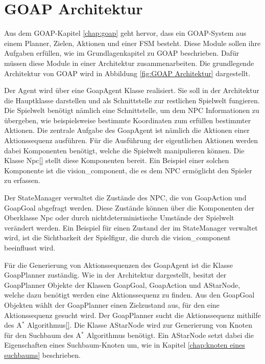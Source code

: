 \section{GOAP Architektur}
\label{chap:goap architektur}

Aus dem GOAP-Kapitel \ref{chap:goap} geht hervor, dass ein GOAP-System aus einem Planner, Zielen, Aktionen und einer FSM besteht. Diese Module sollen ihre Aufgaben erfüllen, wie im Grundlagenkapitel zu GOAP beschrieben. Dafür müssen diese Module in einer Architektur zusammenarbeiten. Die grundlegende Architektur von GOAP wird in Abbildung \ref{fig:GOAP Architektur} dargestellt.

Der Agent wird über eine GoapAgent Klasse realisiert. Sie soll in der Architektur die Hauptklasse darstellen und als Schnittstelle zur restlichen Spielwelt fungieren. Die Spielwelt benötigt nämlich eine Schnittstelle, um dem NPC Informationen zu übergeben, wie beispielsweise bestimmte Koordinaten zum erfüllen bestimmter Aktionen. Die zentrale Aufgabe des GoapAgent ist nämlich die Aktionen einer Aktionssequenz ausführen. Für die Ausführung der eigentlichen Aktionen werden dabei Komponenten benötigt, welche die Spielwelt manipulieren können. Die Klasse Npc\ref{} stellt diese Komponenten bereit. Ein Beispiel einer solchen Komponente ist die vision\_component, die es dem NPC ermöglicht den Spieler zu erfassen.

Der StateManager verwaltet die Zustände des NPC, die von GoapAction und GoapGoal abgefragt werden. Diese Zustände können über die Komponenten der Oberklasse Npc oder durch nichtdeterministische Umstände der Spielwelt verändert werden. Ein Beispiel für einen Zustand der im StateManager verwaltet wird, ist die Sichtbarkeit der Spielfigur, die durch die vision\_component beeinflusst wird.

Für die Generierung von Aktionssequenzen des GoapAgent ist die Klasse GoapPlanner zuständig. Wie in der Architektur dargestellt, besitzt der GoapPlanner Objekte der Klassen GoapGoal, GoapAction und AStarNode, welche dazu benötigt werden eine Aktionssequenz zu finden. Aus den GoapGoal Objekten wählt der GoapPlanner einen Zielzustand aus, für den eine Aktionssequenz gesucht wird. Der GoapPlanner sucht die Aktionssequenz mithilfe des A$^*$ Algorithmus\ref{}. Die Klasse AStarNode wird zur Generierung von Knoten für den Suchbaum des A$^*$ Algorithmus benötigt. Ein AStarNode setzt dabei die Eigenschaften eines Suchbaum-Knoten um, wie in Kapitel \ref{chap:knoten eines suchbaums} beschrieben.

